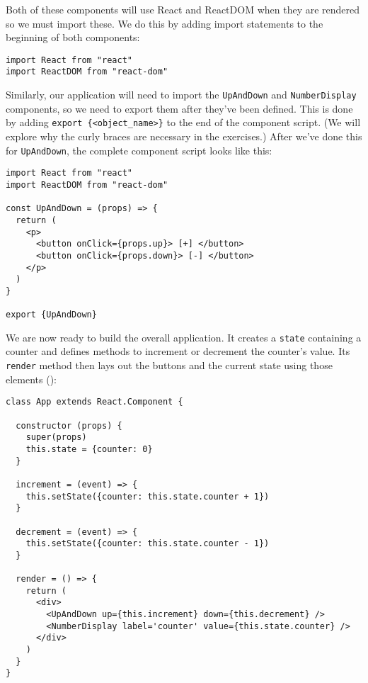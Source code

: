 Both of these components will use React and ReactDOM when they are rendered
so we must import these.
We do this by adding import statements to the beginning of both components:

\begin{verbatim}
import React from "react"
import ReactDOM from "react-dom"
\end{verbatim}

Similarly, our application will need to import the
\texttt{UpAndDown} and \texttt{NumberDisplay} components,
so we need to export them after they've been defined.
This is done by adding \texttt{export\ \{\textless{}object\_name\textgreater{}\}} to the end of the
component script.
(We will explore why the curly braces are necessary in the exercises.)
After we've done this for \texttt{UpAndDown},
the complete component script looks like this:

\begin{verbatim}
import React from "react"
import ReactDOM from "react-dom"

const UpAndDown = (props) => {
  return (
    <p>
      <button onClick={props.up}> [+] </button>
      <button onClick={props.down}> [-] </button>
    </p>
  )
}

export {UpAndDown}
\end{verbatim}

We are now ready to build the overall application.
It creates a \texttt{state} containing a counter
and defines methods to increment or decrement the counter's value.
Its \texttt{render} method then lays out the buttons and the current state
using those elements
():

\begin{verbatim}
class App extends React.Component {

  constructor (props) {
    super(props)
    this.state = {counter: 0}
  }

  increment = (event) => {
    this.setState({counter: this.state.counter + 1})
  }

  decrement = (event) => {
    this.setState({counter: this.state.counter - 1})
  }

  render = () => {
    return (
      <div>
        <UpAndDown up={this.increment} down={this.decrement} />
        <NumberDisplay label='counter' value={this.state.counter} />
      </div>
    )
  }
}
\end{verbatim}


